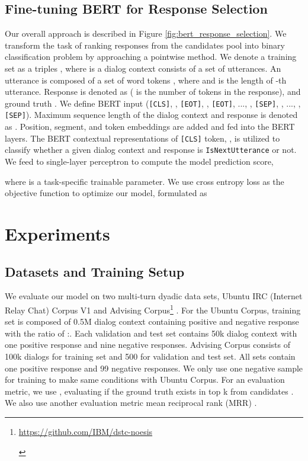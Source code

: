 \documentclass[a4paper]{article}
\begin{document}
\subsection{Fine-tuning BERT for Response Selection}
Our overall approach is described in Figure \ref{fig:bert_response_selection}. We transform the task of ranking responses from the candidates pool into binary classification problem by approaching a pointwise method. We denote a training set as a triples , where  is a dialog context consists of a set of utterances. An utterance  is composed of a set of word tokens , where     and  is the length of -th utterance. Response is denoted as  ( is the number of tokens in the response), and ground truth . We define BERT input   ({\normalsize{\verb|[CLS]|}}, , {\normalsize{\verb|[EOT]|}}, , {\normalsize{\verb|[EOT]|}}, ..., , {\normalsize{\verb|[SEP]|}},  , ..., , {\normalsize{\verb|[SEP]|})}. Maximum sequence length of the dialog context and response is denoted as . Position, segment, and token embeddings are added and fed into the BERT layers. The BERT contextual representations of {\normalsize{\verb|[CLS]|}} token, , is utilized to classify whether a given dialog context and response is {\normalsize{\verb|IsNextUtterance|}} or not. We feed   to single-layer perceptron to compute the model prediction score,

\noindent where  is a task-specific trainable parameter. We use cross entropy loss as the objective function to optimize our model, formulated as
\vspace{-0.15cm}



 \section{Experiments}
\subsection{Datasets and Training Setup}
We evaluate our model on two multi-turn dyadic data sets, Ubuntu IRC (Internet Relay Chat) Corpus V1\cite{lowe2015ubuntu} and Advising Corpus\footnote{\begin{footnotesize}\url{https://github.com/IBM/dstc-noesis}\end{footnotesize}} \cite{dstc19task1}. 
For the Ubuntu Corpus, training set is composed of 0.5M dialog context containing positive and negative response with the ratio of :. Each validation and test set contains 50k dialog context with one positive response and nine negative responses.
Advising Corpus consists of 100k dialogs for training set and 500 for validation and test set. All sets contain one positive response and 99 negative responses. We only use one negative sample for training to make same conditions with Ubuntu Corpus.
For an evaluation metric, we use , evaluating if the ground truth exists in top k from  candidates \cite{lowe2015ubuntu, wu2017sequential}. We also use another evaluation metric mean reciprocal rank (MRR) \cite{voorhees1999trec}. 
\end{document}
